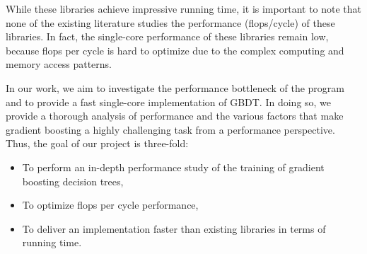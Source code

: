 While these libraries achieve impressive running time, it is important to note that none of the existing literature studies the performance (flops/cycle) of these libraries. In fact, the single-core performance of these libraries remain low, because flops per cycle is hard to optimize due to the complex computing and memory access patterns. 

In our work, we aim to investigate the performance bottleneck of the program and to provide a fast single-core implementation of GBDT. In doing so, we provide a thorough analysis of performance and the various factors that make gradient boosting a highly challenging task from a performance perspective. Thus, the goal of our project is three-fold:
\begin{itemize}[noitemsep, leftmargin=*]
    \item To perform an in-depth performance study of the training of gradient boosting decision trees,
    \item To optimize flops per cycle performance,
    \item To deliver an implementation faster than existing libraries in terms of running time.
\end{itemize}
